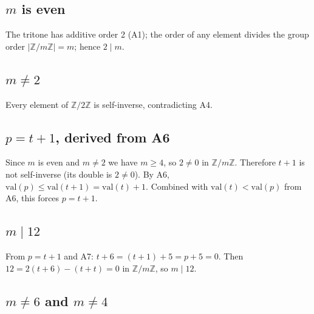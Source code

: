 \documentclass{amsart}
\begin{document}
\subsection*{$m$ is even}

The tritone has additive order 2 (A1); the order of any element divides
the group order $|\mathbb{Z}/m\mathbb{Z}| = m$; hence $2 \mid m$.



\subsection*{$m \neq 2$}

Every element of $\mathbb{Z}/2\mathbb{Z}$ is self-inverse, contradicting A4.



\subsection*{$p = t + 1$, derived from A6}

Since $m$ is even and $m \neq 2$ we have $m \geq 4$, so $2 \neq 0$ in
$\mathbb{Z}/m\mathbb{Z}$.  Therefore $t+1$ is not self-inverse (its
double is $2 \neq 0$).  By A6, $\mathrm{val}(p) \leq \mathrm{val}(t+1)
= \mathrm{val}(t) + 1$.  Combined with $\mathrm{val}(t) < \mathrm{val}(p)$
from A6, this forces $p = t + 1$.



\subsection*{$m \mid 12$}

From $p = t+1$ and A7: $t + 6 = (t+1)+5 = p + 5 = 0$.  Then
$12 = 2(t+6)-(t+t) = 0$ in $\mathbb{Z}/m\mathbb{Z}$, so $m \mid 12$.



\subsection*{$m \neq 6$ and $m \neq 4$}
\end{document}

